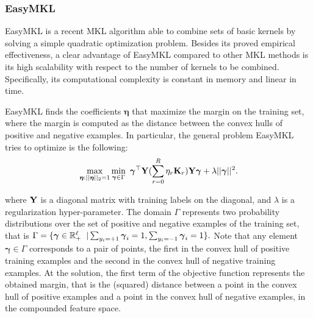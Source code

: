 \documentclass{esannV2}
\newcommand{\Real}{\mathbb{R}}
\newcommand{\KK}{{\bf K}}
\newcommand{\YY}{{\bf Y}}
\newcommand{\1}{{\bf 1}}
\begin{document}
\subsubsection{EasyMKL}
\label{EasyMKL}
EasyMKL \cite{Aiolli2015} is a recent MKL algorithm able to combine sets of basic kernels by solving a simple quadratic optimization problem. Besides its proved empirical effectiveness, a clear advantage of EasyMKL compared to other MKL methods is its high scalability with respect to the number of kernels to be combined. Specifically, its computational complexity is constant in memory and linear in time.

EasyMKL finds the coefficients $\boldsymbol{\eta}$ that maximize the margin on the training set, where the margin is computed as the distance between the convex hulls of positive and negative examples. In particular, the general problem EasyMKL tries to optimize is the following:
\vspace{-0.4cm}
\begin{equation}
\label{eq:easymklotig}
\max_{\boldsymbol{\eta}:||\boldsymbol{\eta}||_2=1} \min_{\boldsymbol{\gamma} \in \Gamma} \mbox { }  \boldsymbol{\gamma}^{\top} \YY ( \sum_{r=0}^R \eta_r \KK_r) \YY \boldsymbol{\gamma} + \lambda ||\boldsymbol{\gamma}||^2.
\end{equation}
\vspace{-0.3cm}

where $\YY$ is a diagonal matrix with training labels on the diagonal, and $\lambda$ is a regularization hyper-parameter. The domain $\Gamma$ represents two probability distributions over the set of positive and negative examples of the training set, that is $\Gamma = \{\boldsymbol{\gamma} \in \Real_+^{\ell} \hspace{0.2cm} |  \sum_{y_i = +1} \boldsymbol{\gamma}_i = 1 , \sum_{y_i = -1} \boldsymbol{\gamma}_i = 1\}.
$
Note that any element $\boldsymbol{\gamma} \in \Gamma$ corresponds to a pair of points, the first in the convex hull of positive training examples and the second in the convex hull of negative training examples.
At the solution, the first term of the objective function represents the obtained margin, that is the (squared) distance between a point in the convex hull of positive examples and a point in the convex hull of negative examples, in the compounded feature space.
\end{document}
